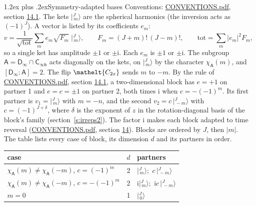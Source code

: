 \documentclass[10pt,a4paper]{article}
\makeatletter
\renewcommand\section{\@startsection{section}{1}{\z@}{-3ex plus -1ex minus -.2ex}%
  {1.2ex plus .2ex}{\normalfont\large\sffamily\bfseries\color{parttitle}}}
\numberwithin{equation}{section}
\newcommand{\eltfont}[1]{{\let\sigma\eltsigma\mathelt{#1}}}
\newcommand{\grp}[1]{\mathsf{#1}}
\newcommand{\elt}[1]{\eltfont{#1}}
\newcommand{\grpindex}[2]{[#1 : #2]}
\newcommand{\iunit}{\mathrm{i}}
\newcommand{\chiA}{\chi_{\grp{A}}}
\newcommand{\jm}[2]{\bigl\lvert{}^{#1}_{\,#2}\bigr\rangle}
\makeatother
\begin{document}
\section{Symmetry-adapted bases}\label{s:bases}
Conventions: \href{../../CONVENTIONS.pdf}{CONVENTIONS.pdf}, section \href{../../CONVENTIONS.pdf\#conv.14.1}{14.1}.
\leavevmode\label{n:index.m}\label{n:vector.ket}The kets $\jm{J}{m}$ are the spherical harmonics (the inversion acts as $(-1)^J$). \label{n:index.ketcoefficient}\label{n:vector.basis.symmetry}\label{n:index.ketweight}\label{n:index.total}A vector is listed by its coefficients $e_m$:
\begin{equation}\label{e:ket}v = \frac{1}{\sqrt{\mathrm{tot}}}\sum_m e_m\sqrt{F_m}\;\jm{J}{m},\qquad F_m = (J+m)!\,(J-m)!,\qquad \mathrm{tot} = \sum_m |e_m|^2F_m,\end{equation}
so a single ket has amplitude $\pm1$ or $\pm\iunit$. Each $e_m$ is $\pm1$ or $\pm\iunit$.
\leavevmode\label{n:group.A}\label{n:function.character.abelian}The subgroup $\grp{A} = \grp{D_{\infty}}\cap\grp{C_{\infty h}}$ acts diagonally on the kets, on $\jm{J}{m}$ by the character $\chiA(m)$, and $\grpindex{\grp{D_{\infty}}}{\grp{A}} = 2$. The flip $\elt{C_{2x}}$ sends $m$ to $-m$. \label{n:index.partner.sign}By the rule of \href{../../CONVENTIONS.pdf}{CONVENTIONS.pdf}, section \href{../../CONVENTIONS.pdf\#conv.14.1}{14.1}, a two-dimensional block has $e = +1$ on partner 1 and $e = c = \pm1$ on partner 2, both times $\iunit$ when $c = -(-1)^m$. Its first partner is $v_1 = \jm{J}{m}$ with $m = -n$, and the second $v_2 = c\,\jm{J}{-m}$ with $c = (-1)^{J+\delta}$, where $\delta$ is the exponent of $z$ in the rotation-diagonal basis of the block's family (section~\ref{s:irreps2}). The factor $\iunit$ makes each block adapted to time reversal (\href{../../CONVENTIONS.pdf}{CONVENTIONS.pdf}, section \href{../../CONVENTIONS.pdf\#conv.14}{14}). Blocks are ordered by $J$, then $|m|$.
\leavevmode\label{n:head.case}\label{n:head.partners}The table lists every case of block, its dimension $d$ and its partners in order.
\begin{center}\begin{tabular}{@{}lrl@{}}\toprule
case & $d$ & partners\\\midrule
$\chiA(m) \ne \chiA(-m)$, $c = (-1)^m$ & 2 & $\jm{J}{m}$;\ $c\,\jm{J}{-m}$\\
$\chiA(m) \ne \chiA(-m)$, $c = -(-1)^m$ & 2 & $\iunit\jm{J}{m}$;\ $\iunit c\,\jm{J}{-m}$\\
$m = 0$ & 1 & $\jm{J}{0}$\\
\bottomrule\end{tabular}\end{center}
\end{document}
